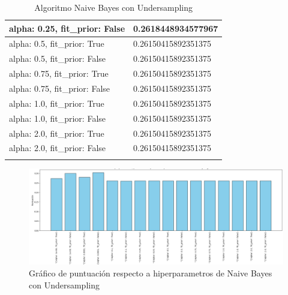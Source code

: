 \documentclass{report}
\begin{document}
{\begin{longtable}{|p{155.6px}|p{100.3px}|}
                    alpha: 0.25, fit\_prior: False&0.2618448934577967\\                    
                    \hline
                    alpha: 0.5, fit\_prior: True&0.26150415892351375\\                    
                    \hline                  
                    alpha: 0.5, fit\_prior: False&0.26150415892351375\\                    
                    \hline
                    alpha: 0.75, fit\_prior: True&0.26150415892351375\\                    
                    \hline                   
                    alpha: 0.75, fit\_prior: False&0.26150415892351375\\                     
                    \hline
                    alpha: 1.0, fit\_prior: True&0.26150415892351375\\                     
                    \hline                   
                    alpha: 1.0, fit\_prior: False&0.26150415892351375\\ 
                    \hline
                    alpha: 2.0, fit\_prior: True&0.26150415892351375\\  
                    \hline
                    alpha: 2.0, fit\_prior: False&0.26150415892351375\\
                    \hline
                    \caption{Algoritmo Naive Bayes con Undersampling}
                \end{longtable}
                \begin{figure}[H]    
                    \centering
                    \includegraphics[width=1\linewidth]{img/ibai5.png}
                    \caption{Gráfico de puntuación respecto a hiperparametros de Naive Bayes con Undersampling}
                \end{figure}
                \label{tab:resultados_analisis_sentimientos} 
                \begin{longtable}{|p{155.6px}|p{100.3px}|}

\end{longtable}}
\end{document}
